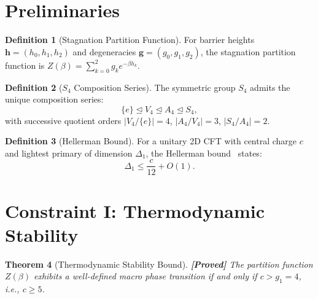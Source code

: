 \documentclass[12pt,a4paper]{article}
\newcommand{\proved}[1]{\textcolor{proved}{\textbf{[Proved]}} #1}
\newtheorem{theorem}{Theorem}[section]
\theoremstyle{definition}
\newtheorem{definition}[theorem]{Definition}
\theoremstyle{remark}
\newcommand{\Sfour}{S_4}
\newcommand{\Vfour}{V_4}
\newcommand{\Afour}{A_4}
\newcommand{\Zpart}{Z(\beta)}
\begin{document}
\section{Preliminaries}
\label{sec:prelim}

\begin{definition}[Stagnation Partition Function]
For barrier heights $\mathbf{h} = (h_0, h_1, h_2)$ and degeneracies $\mathbf{g} = (g_0, g_1, g_2)$, the stagnation partition function is $\Zpart = \sum_{k=0}^{2} g_k e^{-\beta h_k}$.
\end{definition}

\begin{definition}[$\Sfour$ Composition Series]
The symmetric group $\Sfour$ admits the unique composition series:
\begin{equation}
\{e\} \trianglelefteq \Vfour \trianglelefteq \Afour \trianglelefteq \Sfour,
\end{equation}
with successive quotient orders $|\Vfour / \{e\}| = 4$, $|\Afour / \Vfour| = 3$, $|\Sfour / \Afour| = 2$.
\end{definition}

\begin{definition}[Hellerman Bound]
For a unitary 2D CFT with central charge $c$ and lightest primary of dimension $\Delta_1$, the Hellerman bound~\cite{Hellerman2009} states:
\begin{equation}
\Delta_1 \le \frac{c}{12} + O(1).
\end{equation}
\end{definition}

\section{Constraint I: Thermodynamic Stability}
\label{sec:c1}

\begin{theorem}[Thermodynamic Stability Bound]
\label{thm:c1}
\proved{The partition function $\Zpart$ exhibits a well-defined macro phase transition if and only if $c > g_1 = 4$, i.e., $c \ge 5$.}
\end{theorem}
\end{document}
